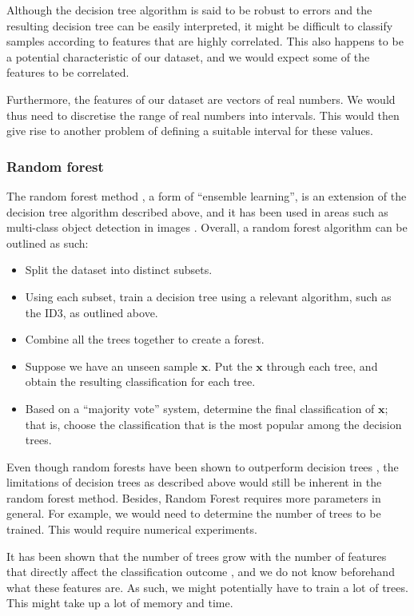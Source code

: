 \documentclass[12pt, twoside, a4paper]{article}
\begin{document}
Although the decision tree algorithm is said to be robust to errors \cite{RefWorks:98} and the resulting decision tree can be easily interpreted, it might be difficult to classify samples according to features that are highly correlated. This also happens to be a potential characteristic of our dataset, and we would expect some of the features to be correlated.

Furthermore, the features of our dataset are vectors of real numbers. We would thus need to discretise the range of real numbers into intervals. This would then give rise to another problem of defining a suitable interval for these values.

\subsubsection{Random forest}
The random forest method \cite{RefWorks:101}, a form of ``ensemble learning'', is an extension of the decision tree algorithm described above, and it has been used in areas such as multi-class object detection in images \cite{RefWorks:100}. Overall, a random forest algorithm can be outlined as such:
\begin{itemize}
\item Split the dataset into distinct subsets.
\item Using each subset, train a decision tree using a relevant algorithm, such as the ID3, as outlined above.
\item Combine all the trees together to create a forest.
\item Suppose we have an unseen sample $\boldsymbol x$.  Put the $\boldsymbol x$ through each tree, and obtain the resulting classification for each tree.
\item Based on a ``majority vote'' system, determine the final classification of $\boldsymbol x$; that is, choose the classification that is the most popular among the decision trees.
\end{itemize}

Even though random forests have been shown to outperform decision trees \cite{RefWorks:103}, the limitations of decision trees as described above would still be inherent in the random forest method. Besides, Random Forest requires more parameters in general. For example, we would need to determine the number of trees to be trained. This would require numerical experiments.

It has been shown that the number of trees grow with the number of features that directly affect the classification outcome \cite{RefWorks:102}, and we do not know beforehand what these features are. As such, we might potentially have to train a lot of trees. This might take up a lot of memory and time.
\end{document}
